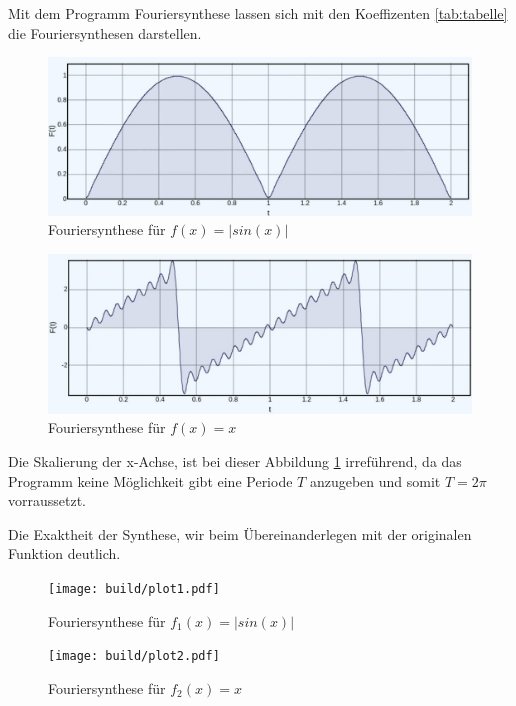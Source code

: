 Mit dem Programm Fouriersynthese \cite{Fouriersynthese} lassen sich mit den Koeffizenten \ref{tab:tabelle} die Fouriersynthesen darstellen.

\begin{figure}
    \centering
    \includegraphics[width=\textwidth]{website/sin.jpg}
    \caption{Fouriersynthese für $f(x)=|sin(x)|$}
\end{figure}


\begin{figure}
    \centering
    \includegraphics[width=\textwidth]{website/x.jpg}
    \caption{Fouriersynthese für $f(x)=x$}
    \label{fig:x_website}
\end{figure}
Die Skalierung der x-Achse, ist bei dieser Abbildung \ref{fig:x_website} irreführend, da das Programm \cite{Fouriersynthese} keine Möglichkeit gibt eine Periode $T$ anzugeben 
und somit $T=2\pi$ vorraussetzt.

\newpage

Die Exaktheit der Synthese, wir beim Übereinanderlegen mit der originalen Funktion deutlich.
\begin{figure}
    \centering
    \texttt{[image: build/plot1.pdf]}
    \caption{Fouriersynthese für $f_1(x)=|sin(x)|$}
    \label{fig:FS_sin}
\end{figure}

\begin{figure}
    \centering
    \texttt{[image: build/plot2.pdf]}
    \caption{Fouriersynthese für $f_2(x)=x$}
    \label{fig:FS_x}
\end{figure}
